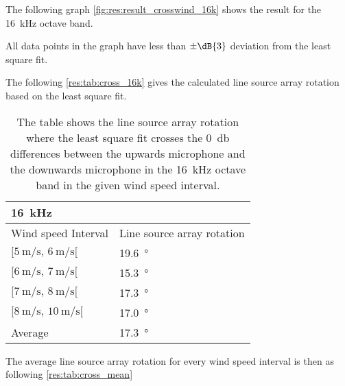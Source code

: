  The following graph \autoref{fig:res:result_crosswind_16k} shows the result for the \SI{16}{\kilo\hertz} octave band. 
 

 All data points in the graph have less than $\pm \dB{3}$ deviation from the least square fit.
 
 The following \autoref{res:tab:cross_16k} gives the calculated line source array rotation based on the least square fit.  
  
 \begin{table}[H]
 \centering
  \caption{The table shows the line source array rotation where the least square fit crosses the \SI{0}{\decibel} differences between the upwards microphone and the downwards microphone in the \SI{16}{\kilo\hertz} octave band in the given wind speed interval.}
\begin{tabular}{l|l}
\multicolumn{2}{l}{\SI{16}{\kilo\hertz}}      \\ \hline
Wind speed Interval & Line source array rotation \\ \hline
  $[\SI{5}{\meter\per\second},\, \SI{6}{\meter\per\second}[ $       &   \SI{19.6}{\degree}    \\
    $[\SI{6}{\meter\per\second},\, \SI{7}{\meter\per\second}[ $     &   \SI{15.3}{\degree}     \\
  $[\SI{7}{\meter\per\second},\, \SI{8}{\meter\per\second}[ $       &    \SI{17.3}{\degree}    \\
   $[\SI{8}{\meter\per\second},\, \SI{10}{\meter\per\second}[ $      &     \SI{17.0}{\degree}  \\ \hline
    Average      &     \SI{17.3}{\degree} 
\end{tabular}
\label{res:tab:cross_16k}
\end{table}    
 
 
The average line source array rotation for every wind speed interval is then as following \autoref{res:tab:cross_mean}

